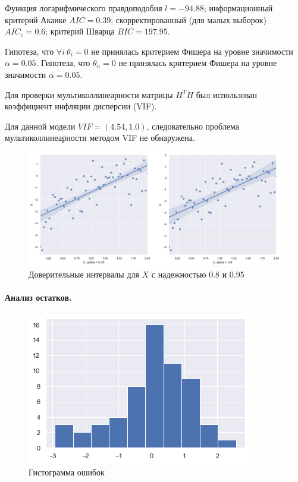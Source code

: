 \documentclass[a4paper,12pt]{article}
\begin{document}
Функция логарифмического правдоподобия $l = -94.88$; информационный критерий Акаике $AIC = 0.39$; скорректированный (для малых выборок) $AIC_c = 0.6$; критерий Шварца $BIC = 197.95$.

Гипотеза, что $\forall i~\theta_i=0$ не принялась критерием Фишера на уровне значимости $\alpha = 0.05$.
Гипотеза, что $\theta_n = 0$ не принялась критерием Фишера на уровне значимости $\alpha = 0.05$.

Для проверки мультиколлинеарности матрицы $H^T H$ был использован коэффициент инфляции дисперсии (VIF).

Для данной модели $VIF = (4.54, 1.0)$, следовательно проблема мультиколлинеарности методом VIF не обнаружена.

\begin{figure}[H]
    \includegraphics[width=\linewidth]{src/img/доврительные_интервалы.png}
    \caption{Доверительные интервалы для $X$ с надежностью 0.8 и 0.95}
\end{figure}


\paragraph{Анализ остатков.\\}
\begin{figure}
    \vspace{-2ex}
    \includegraphics[width=\linewidth]{src/img/гистограмма_ошибок_1.png}
    \caption{Гистограмма ошибок}
\end{figure}
\end{document}
